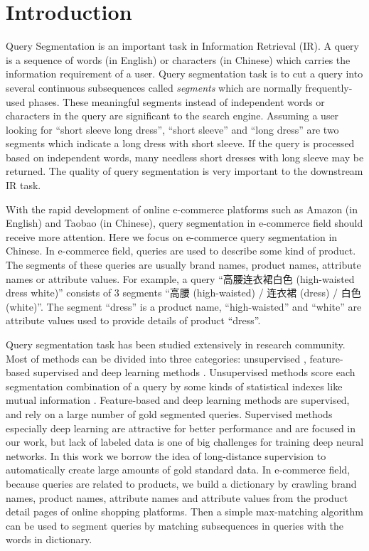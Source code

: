 \section{Introduction}
\label{sec:intro}

Query Segmentation is an important task in Information Retrieval (IR).
A query is a sequence of words (in English) or characters (in Chinese) which carries the information requirement of a user.
Query segmentation task is to cut a query into several continuous subsequences called \emph{segments} which are normally frequently-used phases.
These meaningful segments instead of independent words or characters in the query are significant to the search engine.
Assuming a user looking for ``short sleeve long dress'', ``short sleeve'' and ``long dress'' are two segments which indicate a long dress with short sleeve.
If the query is processed based on independent words, many needless short dresses with long sleeve may be returned. 
The quality of query segmentation is very important to the downstream IR task.

With the rapid development of online e-commerce platforms such as Amazon (in English) and Taobao (in Chinese),
query segmentation in e-commerce field should receive more attention.
Here we focus on e-commerce query segmentation in Chinese.
In e-commerce field, queries are used to describe some kind of product.
The segments of these queries are usually brand names, product names, attribute names or attribute values.
For example, a query ``高腰连衣裙白色 (high-waisted dress white)'' consists of $3$ segments ``高腰 (high-waisted) / 连衣裙 (dress) / 白色 (white)''.
The segment ``dress'' is a product name, ``high-waisted'' and ``white'' are attribute values used to provide details of product ``dress''.

Query segmentation task has been studied extensively in research community.
Most of methods can be divided into three categories: unsupervised \cite{risvik_query_2003,zhang_query_2009,kiseleva_unsupervised_2010,mishra_unsupervised_2011,parikh_segmentation_2013,hagen_power_2010,hagen_query_2011,tan_unsupervised_2008,huang_exploring_2010},
feature-based supervised \cite{yu_query_2009,du_perceptron-based_2014}
and deep learning methods \cite{kale_towards_2017,lin_query_2017}.
Unsupervised methods score each segmentation combination of a query by some kinds of statistical indexes like mutual information \cite{risvik_query_2003}.
Feature-based and deep learning methods are supervised, and rely on a large number of gold segmented queries.
Supervised methods especially deep learning are attractive for better performance and are focused in our work,
but lack of labeled data is one of big challenges for training deep neural networks.
In this work we borrow the idea of long-distance supervision \cite{mintz2009distant} to automatically create large amounts of gold standard data.
In e-commerce field,
because queries are related to products,
we build a dictionary by crawling brand names, product names, attribute names and attribute values from the product detail pages of online shopping platforms.
Then a simple max-matching algorithm can be used to segment queries by matching subsequences in queries with the words in dictionary.


